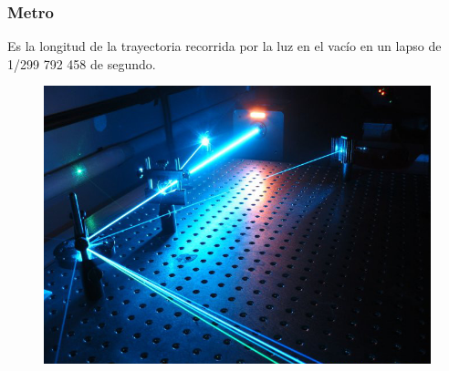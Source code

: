 \begin{frame}[plain]
\frametitle{Metro}
Es la longitud de la trayectoria recorrida por la luz en el vacío en un lapso de 1/299 792 458 de segundo.
\begin{figure}
    \centering
    \includegraphics[scale=0.35]{./Imagenes/Lab1Laser.jpg}
\end{figure}
\end{frame}
